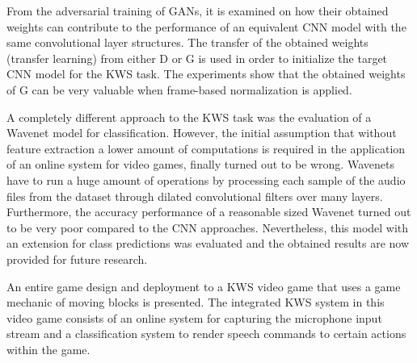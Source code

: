 From the adversarial training of GANs, it is examined on how their obtained weights can contribute to the performance of an equivalent CNN model with the same convolutional layer structures.
The transfer of the obtained weights (transfer learning) from either D or G is used in order to initialize the target CNN model for the KWS task.
The experiments show that the obtained weights of G can be very valuable when frame-based normalization is applied.

A completely different approach to the KWS task was the evaluation of a Wavenet \cite{Oord2016} model for classification.
However, the initial assumption that without feature extraction a lower amount of computations is required in the application of an online system for video games, finally turned out to be wrong.
Wavenets have to run a huge amount of operations by processing each sample of the audio files from the dataset through dilated convolutional filters over many layers.
Furthermore, the accuracy performance of a reasonable sized Wavenet turned out to be very poor compared to the CNN approaches.
Nevertheless, this model with an extension for class predictions was evaluated and the obtained results are now provided for future research.

An entire game design and deployment to a KWS video game that uses a game mechanic of moving blocks is presented.
The integrated KWS system in this video game consists of an online system for capturing the microphone input stream and a classification system to render speech commands to certain actions within the game.
